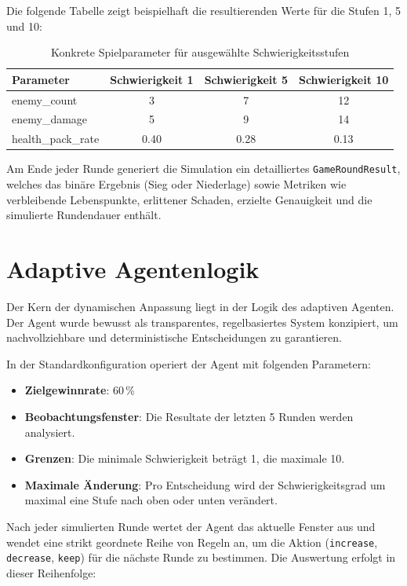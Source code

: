 \documentclass[11pt,a4paper]{article}
\begin{document}
Die folgende Tabelle zeigt beispielhaft die resultierenden Werte für die Stufen 1, 5 und 10:

\begin{table}[H]
    \centering
    \begin{tabular}{lccc}
    \toprule
    \textbf{Parameter} & \textbf{Schwierigkeit 1} & \textbf{Schwierigkeit 5} & \textbf{Schwierigkeit 10} \\
    \midrule
    enemy\_count & 3 & 7 & 12 \\
    enemy\_damage & 5 & 9 & 14 \\
    health\_pack\_rate & 0.40 & 0.28 & 0.13 \\
    \bottomrule
    \end{tabular}
    \caption{Konkrete Spielparameter für ausgewählte Schwierigkeitsstufen}
\end{table}

Am Ende jeder Runde generiert die Simulation ein detailliertes \texttt{GameRoundResult}, welches das binäre Ergebnis (Sieg oder Niederlage) sowie Metriken wie verbleibende Lebenspunkte, erlittener Schaden, erzielte Genauigkeit und die simulierte Rundendauer enthält.

\section{Adaptive Agentenlogik}

Der Kern der dynamischen Anpassung liegt in der Logik des adaptiven Agenten. Der Agent wurde bewusst als transparentes, regelbasiertes System konzipiert, um nachvollziehbare und deterministische Entscheidungen zu garantieren. 

In der Standardkonfiguration operiert der Agent mit folgenden Parametern:
\begin{itemize}
    \item \textbf{Zielgewinnrate}: 60\,\%
    \item \textbf{Beobachtungsfenster}: Die Resultate der letzten 5 Runden werden analysiert.
    \item \textbf{Grenzen}: Die minimale Schwierigkeit beträgt 1, die maximale 10.
    \item \textbf{Maximale Änderung}: Pro Entscheidung wird der Schwierigkeitsgrad um maximal eine Stufe nach oben oder unten verändert.
\end{itemize}

Nach jeder simulierten Runde wertet der Agent das aktuelle Fenster aus und wendet eine strikt geordnete Reihe von Regeln an, um die Aktion (\texttt{increase}, \texttt{decrease}, \texttt{keep}) für die nächste Runde zu bestimmen. Die Auswertung erfolgt in dieser Reihenfolge:
\end{document}
